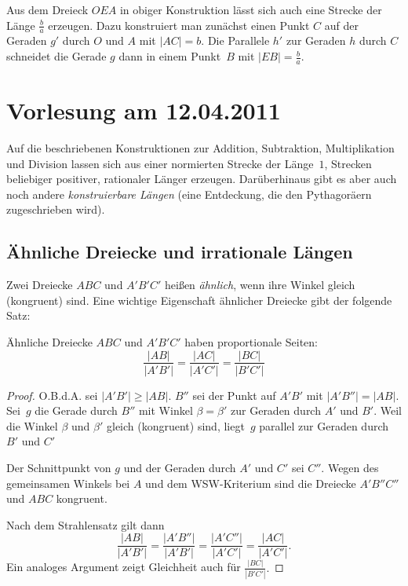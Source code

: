Aus dem Dreieck $OEA$ in obiger Konstruktion lässt sich auch 
eine Strecke der Länge $\frac{b}{a}$ erzeugen. Dazu konstruiert man
zunächst einen Punkt $C$ auf der Geraden $g'$ durch $O$ und $A$ mit
$|AC|=b$.  Die Parallele $h'$ zur Geraden $h$ durch $C$ 
schneidet die Gerade $g$ dann in einem Punkt~$B$ mit $|EB|=\frac{b}{a}$.



\section*{Vorlesung am 12.04.2011}

Auf die beschriebenen Konstruktionen zur Addition, Subtraktion,
Multiplikation und Division lassen sich aus einer normierten Strecke
der Länge~$1$, Strecken beliebiger positiver, rationaler Länger
erzeugen. Darüberhinaus gibt es aber auch noch andere {\em
  konstruierbare Längen} (eine Entdeckung, die den Pythagoräern
zugeschrieben wird).



\subsection*{Ähnliche Dreiecke und irrationale Längen} 

Zwei Dreiecke $ABC$ und $A'B'C'$ heißen {\em ähnlich}, wenn ihre
Winkel gleich (kongruent) sind. Eine wichtige Eigenschaft ähnlicher
Dreiecke gibt der folgende Satz:


\begin{thm}
Ähnliche Dreiecke $ABC$ und $A'B'C'$ haben proportionale Seiten:
$$
\frac{|AB|}{|A'B'|}
=
\frac{|AC|}{|A'C'|}
=
\frac{|BC|}{|B'C'|}
$$
\end{thm}


\begin{proof}
O.B.d.A. sei $|A'B'|\geq |AB|$. $B''$ sei der Punkt auf $A'B'$
mit $|A'B''|=|AB|$. 
Sei~$g$ die Gerade durch $B''$ mit Winkel $\beta=\beta'$ zur Geraden durch
$A'$ und $B'$. Weil die Winkel $\beta$ und $\beta'$ gleich (kongruent)
sind, liegt~$g$ parallel zur Geraden durch $B'$ und $C'$

Der Schnittpunkt von $g$ und der Geraden durch $A'$ und $C'$ sei
$C''$. Wegen des gemeinsamen Winkels bei $A$ und dem WSW-Kriterium
sind die Dreiecke $A'B''C''$ und $ABC$ kongruent. 

Nach dem Strahlensatz gilt dann
$$
\frac{|AB|}{|A'B'|}
=
\frac{|A'B''|}{|A'B'|}
=
\frac{|A'C''|}{|A'C'|}
=
\frac{|AC|}{|A'C'|}
.
$$
Ein analoges Argument %
zeigt Gleichheit auch für 
$\displaystyle \frac{|BC|}{|B'C'|}.$
\end{proof}



